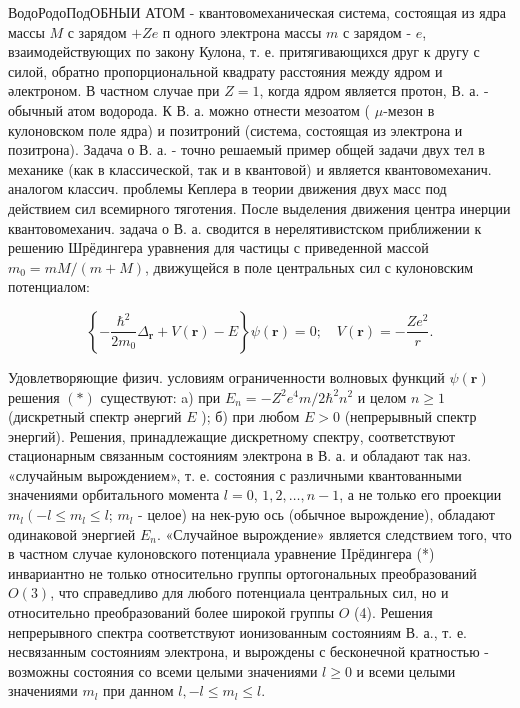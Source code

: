 \documentclass[10pt]{article}
\begin{document}
ВодоРодоПодОБНЫИ АТОМ - квантовомеханическая система, состоящая из ядра массы $M$ с зарядом $+Z e$ п одного электрона массы $m$ с зарядом - $e$, взаимодействующих по закону Кулона, т. е. притягивающихся друг к другу с силой, обратно пропорциональной квадрату расстояния между ядром и әлектроном. В частном случае при $Z=1$, когда ядром является протон, В. а. - обычный атом водорода. К В. а. можно отнести мезоатом ( $\mu$-мезон в кулоновском поле ядра) и позитроний (система, состоящая из электрона и позитрона). Задача о В. а. - точно решаемый пример общей задачи двух тел в механике (как в классической, так и в квантовой) и является квантовомеханич. аналогом классич. проблемы Кеплера в теории движения двух масс под действием сил всемирного тяготения. После выделения движения центра инерции квантовомеханич. задача о В. а. сводится в нерелятивистском приближении к решению Шрёдингера уравнения для частицы с приведенной массой $m_{0}=m M /(m+M)$, движущейся в поле центральных сил с кулоновским потенциалом:



\[

\left\{-\frac{\hbar^{2}}{2 m_{0}} \Delta_{\boldsymbol{r}}+V(\boldsymbol{r})-E\right\} \psi(\boldsymbol{r})=0 ; \quad V(\boldsymbol{r})=-\frac{Z e^{2}}{r} .

\]



Удовлетворяющие физич. условиям ограниченности волновых функций $\psi(\boldsymbol{r})$ решения $(*)$ существуют: a) при $E_{n}=-Z^{2} e^{4} m / 2 \hbar^{2} n^{2}$ и целом $n \geqslant 1$ (дискретный спектр әнергий $E$ ); б) при любом $E>0$ (непрерывный спектр энергий). Решения, принадлежащие дискретному спектру, соответствуют стационарным связанным состояниям электрона в В. а. и обладают так наз. «случайным вырождением», т. е. состояния с различными квантованными значениями орбитального момента $l=0$, $1,2, \ldots, n-1$, а не только его проекции $m_{l}\left(-l \leqslant m_{l} \leqslant l\right.$; $m_{l}$ - целое) на нек-рую ось (обычное вырождение), обладают одинаковой энергией $E_{n}$. «Случайное вырождение» является следствием того, что в частном случае кулоновского потенциала уравнение IIрёдингера (*) инвариантно не только относительно группы ортогональных преобразований $O(3)$, что справедливо для любого потенциала центральных сил, но и относительно преобразований более широкой группы $O$ (4). Решения непрерывного спектра соответствуют ионизованным состояниям В. а., т. е. несвязанным состояниям электрона, и вырождены с бесконечной кратностью - возможны состояния со всеми целыми значениями $l \geqslant 0$ и всеми целыми значениями $m_{l}$ при данном $l,-l \leqslant m_{l} \leqslant l$.
\end{document}
